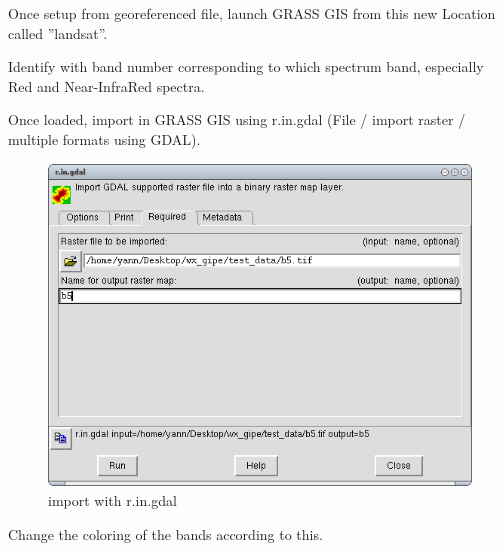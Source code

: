 Once setup from georeferenced file, launch GRASS GIS from this new Location called ''landsat''.

Identify with band number corresponding to which spectrum band, especially Red and Near-InfraRed spectra.

Once loaded, import in GRASS GIS using r.in.gdal (File / import raster / multiple formats using GDAL).

\begin{figure}[htbp]
   \centering
   \includegraphics[scale=0.35]{grass_rs002.png}
   \caption{import with r.in.gdal}
   \label{fig:grass_rs002}
\end{figure}

Change the coloring of the bands according to this.

